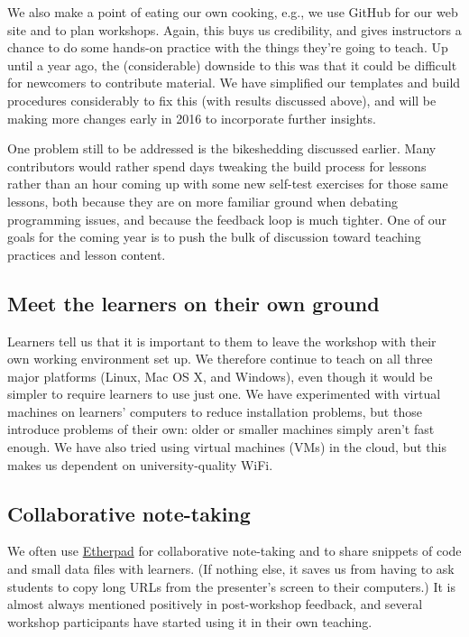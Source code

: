 \documentclass[10pt,a4paper,twocolumn]{article}
\begin{document}
We also make a point of eating our own cooking, e.g., we use GitHub
for our web site and to plan workshops. Again, this buys us
credibility, and gives instructors a chance to do some hands-on
practice with the things they're going to teach.  Up until a year ago,
the (considerable) downside to this was that it could be difficult for
newcomers to contribute material.  We have simplified our templates
and build procedures considerably to fix this (with results discussed
above), and will be making more changes early in 2016 to incorporate
further insights.

One problem still to be addressed is the bikeshedding discussed
earlier.  Many contributors would rather spend days tweaking the build
process for lessons rather than an hour coming up with some new
self-test exercises for those same lessons, both because they are on
more familiar ground when debating programming issues, and because the
feedback loop is much tighter.  One of our goals for the coming year
is to push the bulk of discussion toward teaching practices and lesson
content.

\subsection*{Meet the learners on their own ground}

Learners tell us that it is important to them to leave the workshop
with their own working environment set up. We therefore continue to
teach on all three major platforms (Linux, Mac OS X, and Windows),
even though it would be simpler to require learners to use just
one. We have experimented with virtual machines on learners' computers
to reduce installation problems, but those introduce problems of their
own: older or smaller machines simply aren't fast enough.  We have
also tried using virtual machines (VMs) in the cloud, but this makes
us dependent on university-quality WiFi.

\subsection*{Collaborative note-taking}

We often use \href{http://etherpad.org}{Etherpad} for collaborative
note-taking and to share snippets of code and small data files with
learners. (If nothing else, it saves us from having to ask students to
copy long URLs from the presenter's screen to their computers.) It is
almost always mentioned positively in post-workshop feedback, and
several workshop participants have started using it in their own
teaching.
\end{document}
